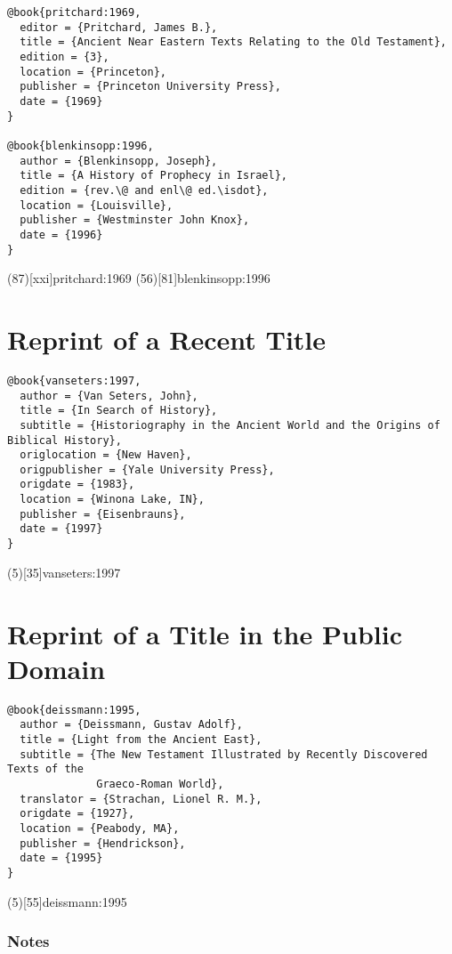 \documentclass[a4paper]{article}
\begin{document}
\begin{verbatim}
@book{pritchard:1969,
  editor = {Pritchard, James B.},
  title = {Ancient Near Eastern Texts Relating to the Old Testament},
  edition = {3},
  location = {Princeton},
  publisher = {Princeton University Press},
  date = {1969}
}

@book{blenkinsopp:1996,
  author = {Blenkinsopp, Joseph},
  title = {A History of Prophecy in Israel},
  edition = {rev.\@ and enl\@ ed.\isdot},
  location = {Louisville},
  publisher = {Westminster John Knox},
  date = {1996}
}
\end{verbatim}

\examplecite(87)[xxi]{pritchard:1969}
\examplecite(56)[81]{blenkinsopp:1996}
\examplebibliography

\section{Reprint of a Recent Title}

\begin{verbatim}
@book{vanseters:1997,
  author = {Van Seters, John},
  title = {In Search of History},
  subtitle = {Historiography in the Ancient World and the Origins of Biblical History},
  origlocation = {New Haven},
  origpublisher = {Yale University Press},
  origdate = {1983},
  location = {Winona Lake, IN},
  publisher = {Eisenbrauns},
  date = {1997}
}
\end{verbatim}

\examplecite(5)[35]{vanseters:1997}
\examplebibliography

\section{Reprint of a Title in the Public Domain}

\begin{verbatim}
@book{deissmann:1995,
  author = {Deissmann, Gustav Adolf},
  title = {Light from the Ancient East},
  subtitle = {The New Testament Illustrated by Recently Discovered Texts of the
              Graeco-Roman World},
  translator = {Strachan, Lionel R. M.},
  origdate = {1927},
  location = {Peabody, MA},
  publisher = {Hendrickson},
  date = {1995}
}
\end{verbatim}

\examplecite(5)[55]{deissmann:1995}
\examplebibliography

\subsubsection{Notes}
\end{document}
